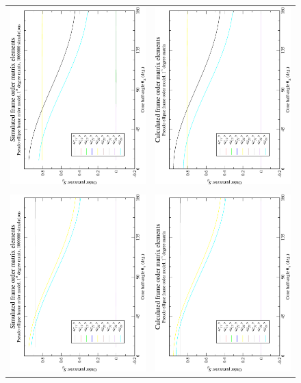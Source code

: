 \begin{figure}
\centering
  \begin{tabular}{@{}cc@{}}
    \includegraphics[width=.35\textwidth,angle=270]{images/frame_order_matrix/Sij_pseudo-ellipse_in_frame_theta_x_ens1000000.eps} &
    \includegraphics[width=.35\textwidth,angle=270]{images/frame_order_matrix/Sij_pseudo-ellipse_in_frame_theta_x_calc.eps} \\
    \\[-5pt]
    \includegraphics[width=.35\textwidth,angle=270]{images/frame_order_matrix/Sij_pseudo-ellipse_in_frame_theta_y_ens1000000.eps} &
    \includegraphics[width=.35\textwidth,angle=270]{images/frame_order_matrix/Sij_pseudo-ellipse_in_frame_theta_y_calc.eps} \\

\end{tabular}
\end{figure}
